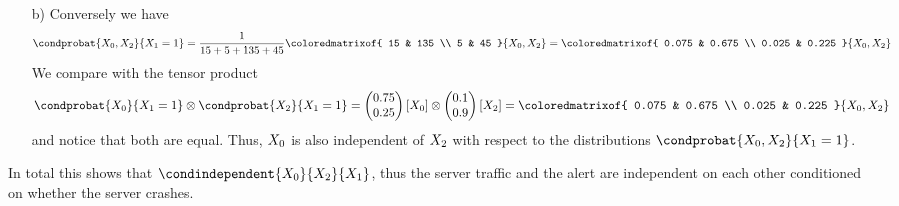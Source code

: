 \documentclass{scrartcl}
\begin{document}
{\begin{itemize}
\begin{itemize}
\begin{align*}
                \end{align*}
                and thus, $\catvariableof{0}$ is independent of $\catvariableof{2}$ with respect to the distributions $\condprobat{\catvariableof{0},\catvariableof{2}}{\catvariableof{1}=0}$.
                \item[b)] Conversely we have
                \begin{align*}
                    \condprobat{\catvariableof{0},\catvariableof{2}}{\catvariableof{1}=1}
                    = \frac{1}{15+5+135+45} \coloredmatrixof{
                        15 & 135 \\ 5 & 45
                    }{\catvariableof{0},\catvariableof{2}}
                    = \coloredmatrixof{
                        0.075 & 0.675 \\ 0.025 & 0.225
                    }{\catvariableof{0},\catvariableof{2}}
                \end{align*}
                We compare with the tensor product
                \begin{align*}
                    \condprobat{\catvariableof{0}}{\catvariableof{1}=1}
                    \otimes
                    \condprobat{\catvariableof{2}}{\catvariableof{1}=1}
                    =               \begin{pmatrix}
                                        0.75 \\ 0.25
                    \end{pmatrix}[\catvariableof{0}]
                    \otimes
                    \begin{pmatrix}
                        0.1 \\ 0.9
                    \end{pmatrix}[\catvariableof{2}]
                    = \coloredmatrixof{
                        0.075 & 0.675 \\ 0.025 & 0.225
                    }{\catvariableof{0},\catvariableof{2}}
                \end{align*}
                and notice that both are equal.
                Thus, $\catvariableof{0}$ is also independent of $\catvariableof{2}$ with respect to the distributions $\condprobat{\catvariableof{0},\catvariableof{2}}{\catvariableof{1}=1}$.
            \end{itemize}
            In total this shows that $\condindependent{\catvariableof{0}}{\catvariableof{2}}{\catvariableof{1}}$, thus the server traffic and the alert are independent on each other conditioned on whether the server crashes.
        \end{itemize}
    }
\end{document}
